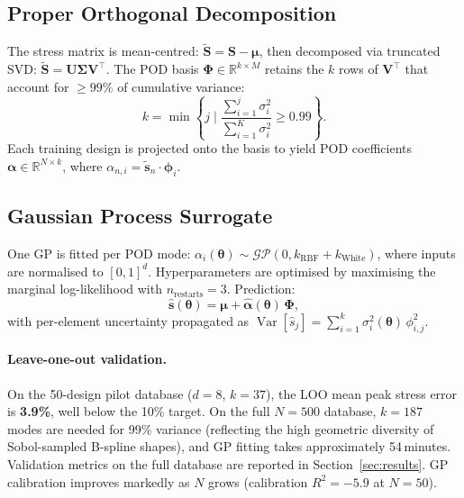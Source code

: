 \documentclass[10pt,twocolumn]{article}
\begin{document}
\subsection{Proper Orthogonal Decomposition}
\label{sec:pod}

The stress matrix is mean-centred:
$\widetilde{\mathbf{S}} = \mathbf{S} - \boldsymbol{\mu}$,
then decomposed via truncated SVD:
$\widetilde{\mathbf{S}} = \mathbf{U}\boldsymbol{\Sigma}\mathbf{V}^\top$.
The POD basis $\boldsymbol{\Phi} \in \mathbb{R}^{k \times M}$ retains the
$k$ rows of $\mathbf{V}^\top$ that account for ${\geq}99\%$ of cumulative
variance:
\begin{equation}
  k = \min\left\{j \;\Big|\; \frac{\sum_{i=1}^j \sigma_i^2}{\sum_{i=1}^K \sigma_i^2} \geq 0.99\right\}.
\end{equation}
Each training design is projected onto the basis to yield POD coefficients
$\boldsymbol{\alpha} \in \mathbb{R}^{N \times k}$, where
$\alpha_{n,i} = \widetilde{\mathbf{s}}_n \cdot \boldsymbol{\phi}_i$.

\subsection{Gaussian Process Surrogate}
\label{sec:gp}

One GP is fitted per POD mode: $\alpha_i(\boldsymbol{\theta}) \sim
\mathcal{GP}(0, k_{\mathrm{RBF}} + k_{\mathrm{White}})$, where inputs
are normalised to $[0,1]^d$.  Hyperparameters are optimised by maximising
the marginal log-likelihood with $n_{\mathrm{restarts}} = 3$.  Prediction:
\begin{equation}
  \hat{\mathbf{s}}(\boldsymbol{\theta}) =
    \boldsymbol{\mu} + \hat{\boldsymbol{\alpha}}(\boldsymbol{\theta})\,\boldsymbol{\Phi},
\end{equation}
with per-element uncertainty propagated as
$\operatorname{Var}[\hat{s}_j] = \sum_{i=1}^k \sigma^2_i(\boldsymbol{\theta})\,\phi_{i,j}^2$.

\paragraph{Leave-one-out validation.}
On the 50-design pilot database ($d{=}8$, $k{=}37$), the LOO mean peak
stress error is \textbf{3.9\%}, well below the 10\% target.  On the full
$N{=}500$ database, $k{=}187$ modes are needed for 99\% variance (reflecting
the high geometric diversity of Sobol-sampled B-spline shapes), and GP
fitting takes approximately 54\,minutes.  Validation metrics on the full
database are reported in Section~\ref{sec:results}.  GP calibration
improves markedly as $N$ grows (calibration $R^2 = -5.9$ at $N{=}50$).
\end{document}
